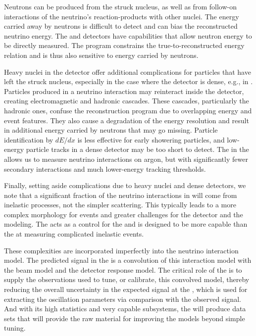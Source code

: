 Neutrons can be produced from the struck nucleus, as well as from follow-on interactions of the neutrino's reaction-products with other nuclei. The energy carried away by neutrons is difficult to detect and can bias the reconstructed neutrino energy. The   and  detectors have capabilities that allow neutron energy to be directly measured. The  program constrains the true-to-reconstructed energy relation and is thus also sensitive to energy carried by neutrons.

Heavy nuclei in the detector offer additional complications for particles that have left the struck nucleus, especially in the case where the detector is dense, e.g., in . Particles produced in a neutrino interaction may  reinteract inside the detector, creating electromagnetic and hadronic cascades. These cascades, particularly the hadronic ones, %
confuse the reconstruction program due to overlapping energy and event features. They also cause a degradation of the energy resolution and result in additional energy carried by neutrons that may go missing. Particle identification by $dE/dx$ is less effective for early showering particles, and  low-energy particle tracks in a dense detector may be too short to detect.  The  in the  
allows us to measure neutrino interactions %
on argon, but with significantly fewer secondary interactions and much lower-energy tracking thresholds.



Finally, setting aside complications due to heavy nuclei and dense detectors, we note that a significant fraction of the neutrino interactions in  will come from inelastic processes, not the simpler  scattering. 
This typically leads to a more complex morphology for events and greater challenges for the detector and the modeling.  The   acts as a control for the  and is designed to be more capable than the  at measuring complicated inelastic events.

These complexities are incorporated imperfectly into the neutrino interaction model. The predicted signal in the  is a convolution of this interaction model with the beam model and the detector response model.  The critical role of  the   is to supply the observations used to tune, or calibrate, this convolved model, thereby reducing the overall uncertainty in the expected signal at the , which is used for extracting the oscillation parameters via comparison with the observed signal.  And with its high statistics and very capable subsystems, the  will produce data sets that will provide the raw material for %
improving the models beyond simple tuning.  



